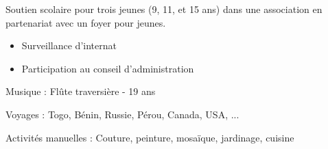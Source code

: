 \divider

Soutien scolaire pour trois jeunes (9, 11, et 15 ans) dans une association en
partenariat avec un foyer pour jeunes.

\divider

\begin{itemize}
\item Surveillance d'internat
\item Participation au conseil d'administration
\end{itemize}



{ \color{emphasis} \faMusic \hspace{0.12cm}  Musique : } 
    Flûte traversière - 19 ans\\
  \vspace{0.25cm}

{\color{emphasis} \faGlobe \hspace{0.12cm} Voyages : }  
    Togo, Bénin, Russie, Pérou, Canada, USA, ...\\
  \vspace{0.25cm}
  
{\color{emphasis} \faCut  \hspace{0.12cm} Activités manuelles : }
    Couture, peinture, mosaïque, jardinage, cuisine
